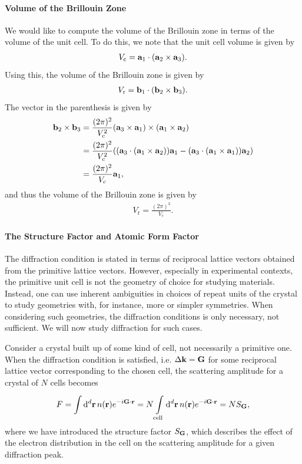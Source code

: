 \paragraph{Volume of the Brillouin Zone}
We would like to compute the volume of the Brillouin zone in terms of the volume of the unit cell. To do this, we note that the unit cell volume is given by
\begin{align*}
	V_{\text{c}} = \vb{a}_{1}\cdot(\vb{a}_{2}\times\vb{a}_{3}).
\end{align*}
Using this, the volume of the Brillouin zone is given by
\begin{align*}
	V_{\text{r}} = \vb{b}_{1}\cdot(\vb{b}_{2}\times\vb{b}_{3}).
\end{align*}
The vector in the parenthesis is given by
\begin{align*}
	\vb{b}_{2}\times\vb{b}_{3} &= \frac{(2\pi)^{2}}{V_{\text{c}}^{2}}(\vb{a}_{3}\times\vb{a}_{1})\times (\vb{a}_{1}\times\vb{a}_{2}) \\
	                           &= \frac{(2\pi)^{2}}{V_{\text{c}}^{2}}((\vb{a}_{3}\cdot(\vb{a}_{1}\times\vb{a}_{2}))\vb{a}_{1} - (\vb{a}_{3}\cdot(\vb{a}_{1}\times\vb{a}_{1}))\vb{a}_{2}) \\
	                           &= \frac{(2\pi)^{2}}{V_{\text{c}}}\vb{a}_{1},
\end{align*}
and thus the volume of the Brillouin zone is given by
\begin{align*}
	V_{\text{r}} = \frac{(2\pi)^{3}}{V_{\text{c}}}.
\end{align*}

\paragraph{The Structure Factor and Atomic Form Factor}
The diffraction condition is stated in terms of reciprocal lattice vectors obtained from the primitive lattice vectors. However, especially in experimental contexts, the primitive unit cell is not the geometry of choice for studying materials. Instead, one can use inherent ambiguities in choices of repeat units of the crystal to study geometries with, for instance, more or simpler symmetries. When considering such geometries, the diffraction conditions is only necessary, not sufficient. We will now study diffraction for such cases.

Consider a crystal built up of some kind of cell, not necessarily a primitive one. When the diffraction condition is satisfied, i.e. $\Delta\vb{k} = \vb{G}$ for some reciprocal lattice vector corresponding to the chosen cell, the scattering amplitude for a crystal of $N$ cells becomes
\begin{align*}
	F = \integ[d]{}{}{\vb{r}}{n(\vb{r})e^{-i\vb{G}\cdot\vb{r}}} = N\integ[d]{\text{cell}}{}{\vb{r}}{n(\vb{r})e^{-i\vb{G}\cdot\vb{r}}} = NS_{\vb{G}},
\end{align*}
where we have introduced the structure factor $S_{\vb{G}}$, which describes the effect of the electron distribution in the cell on the scattering amplitude for a given diffraction peak.

